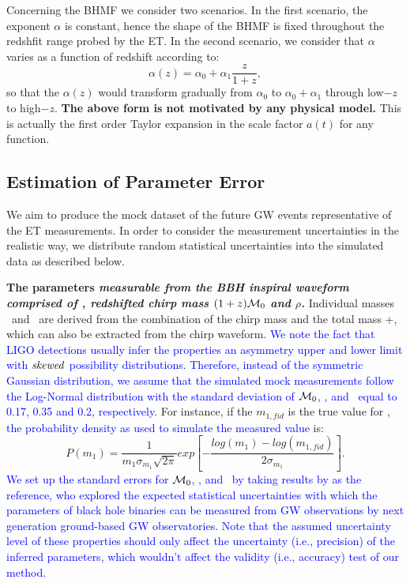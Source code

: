 \documentclass[twocolumn]{aastex62}
\newcommand{\kai}[1]{\textcolor{red}{[{\bf Kai}: #1]}}
\newcommand{\blue}[1]{\textcolor{blue}{#1}}
\begin{document}
Concerning the BHMF we consider two scenarios. In the first scenario, the exponent $\alpha$ is constant, hence the shape of the BHMF is fixed throughout the redshfit range probed by the ET. In the second scenario, we consider that $\alpha$ varies as a function of redshift according to:
 \begin{equation} \label{equ_alphaz}
\alpha(z) = \alpha_0 + \alpha_1\frac{z}{1+z} , 
 \end{equation}
so that the $\alpha(z)$ would transform gradually from $\alpha_0$ to $\alpha_0+\alpha_1$ through low$-z$ to high$-z$. \textbf{The above form is not motivated by any physical model.}
This is actually the first order Taylor expansion in the scale factor $a(t)$ for any function.

\subsection{Estimation of Parameter Error} \label{sec_noiselevel}
We aim to produce the mock dataset of the future GW events representative of the ET  measurements. In order to consider the measurement uncertainties in the realistic way, we distribute random statistical uncertainties into the simulated data as described below.

\textbf{The parameters \it{measurable} from the BBH inspiral waveform comprised of \dl, redshifted chirp mass $(1+z){\cal M}_0 $ and $\rho$.} Individual masses \mone\ and \mtwo\ are derived from the combination of the chirp mass and the total mass \mone+\mtwo, which can also be extracted from the chirp waveform. 
\blue{We note the fact that LIGO detections usually infer the properties an asymmetry upper and lower limit with ${\it skewed}$ possibility distributions. Therefore, instead of the symmetric Gaussian distribution, we assume that the simulated mock measurements follow the Log-Normal distribution with the standard deviation of  ${\cal M}_0$, \dl, and \mone\ equal to 0.17, 0.35 and 0.2, respectively.}
For instance, if the $m_{1,fid}$ is the true value for \mone, \blue{the probability density as used to simulate the measured value} is:
 \begin{equation} \label{equ_lognorm}
P(m_1) = \frac{1}{m_1 \sigma_{m_1} \sqrt{2\pi}} exp \left[- \frac{log(m_1)-log(m_{1,fid})}{2\sigma_{m_1}} \right].
 \end{equation}
\blue{We set up the standard errors for ${\cal M}_0$, \dl, and \mone\ by taking results by \citet{Ghosh2016} as the reference, who explored the expected statistical uncertainties with which the parameters of black hole binaries can be measured from GW observations by next generation ground-based GW observatories. Note that the assumed uncertainty level of these properties should only affect the uncertainty (i.e., precision) of the inferred parameters, which wouldn't affect the validity (i.e., accuracy) test of our method.
}
 
\end{document}
